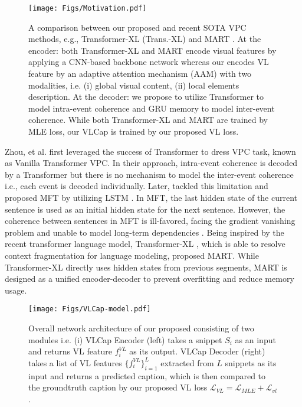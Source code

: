 \documentclass{article}
\begin{document}
\begin{figure}[!t]
    \centering
    \texttt{[image: Figs/Motivation.pdf]}
    \vspace{-3mm}
    \caption{A comparison between our proposed \model and recent SOTA VPC methods, e.g., Transformer-XL (Trans.-XL) \cite{dai2019transformer} and MART \cite{lei2020mart}. At the encoder: both Transformer-XL and MART encode visual features by applying a CNN-based backbone network whereas our \model encodes VL feature by an adaptive attention mechanism (AAM) \cite{vo2021aei} with two modalities, i.e. (i) global visual content, (ii) local elements description. At the decoder: we propose to utilize Transformer to model intra-event coherence and GRU memory to model inter-event coherence. While both  Transformer-XL and MART are trained by MLE loss, our VLCap is trained by our proposed VL loss. \vspace{-5mm}
    }
    \label{fig:compare_model}
\end{figure}

Zhou, et al. \cite{zhou2018end} first leveraged the success of Transformer \cite{vaswani2017attention} to dress VPC task, known as Vanilla Transformer VPC. In their approach, intra-event coherence is decoded by a Transformer but there is no mechanism to model the inter-event coherence i.e., each event is decoded individually. Later, \cite{xiong2018move} tackled this limitation and proposed MFT by utilizing LSTM \cite{hochreiter1997long}. In MFT, the last hidden state of the current sentence is used as an initial hidden state for the next sentence. However, the coherence between sentences in MFT is ill-favored, facing the gradient vanishing problem \cite{pascanu2013difficulty} and unable to model long-term dependencies \cite{hochreiter2001gradient}. Being inspired by the recent transformer language model, Transformer-XL \cite{dai2019transformer}, which is able to resolve context fragmentation for language modeling, \cite{lei2020mart} proposed MART. While Transformer-XL directly uses hidden states from previous segments, MART is designed as a unified encoder-decoder to prevent overfitting and reduce memory usage. 

\begin{figure*}[]
    \centering
    \texttt{[image: Figs/VLCap-model.pdf]}
    \vspace{-4mm}
    \caption{ Overall network architecture of our proposed \model consisting of two modules i.e. (i) VLCap Encoder (left) takes a snippet $S_i$ as an input and returns VL feature $f_i^{VL}$ as its output. VLCap Decoder (right) takes a list of VL features $\{f_i^{VL}\}_{i=1}^{L}$ extracted from $L$ snippets as its input and returns a predicted caption, which is then compared to the groundtruth caption by our proposed VL loss $\mathcal{L}_{VL} = \mathcal{L}_{MLE} + \mathcal{L}_{vl}$. \vspace{-5mm}}
    \label{fig:overall}
\end{figure*}
\end{document}
